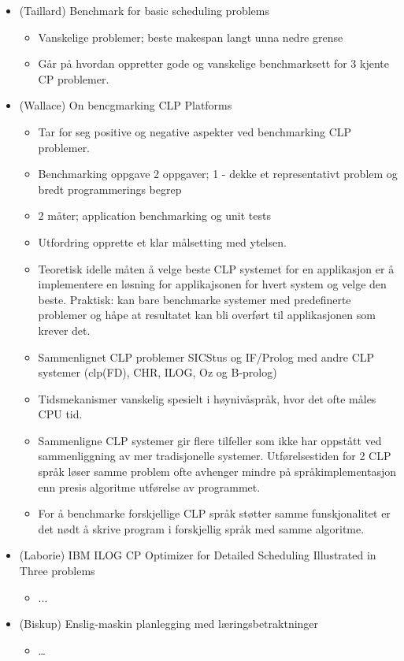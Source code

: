 \begin{itemize}
\item (Taillard) Benchmark for basic scheduling problems \cite{Taillard1993278}
\begin{itemize}
\item Vanskelige problemer; beste makespan langt unna nedre grense
\item Går på hvordan oppretter gode og vanskelige benchmarksett for 3 kjente CP problemer.
\end{itemize}
\item (Wallace) On bencgmarking CLP Platforms \cite{Wallace:2004:BCL:956860.956861}
\begin{itemize}
\item Tar for seg positive og negative aspekter ved benchmarking CLP problemer.
\item Benchmarking oppgave 2 oppgaver; 1 - dekke et representativt problem og bredt programmerings begrep
\item 2 måter; application benchmarking og unit tests
\item Utfordring opprette et klar målsetting med ytelsen.
\item Teoretisk idelle måten å velge beste CLP systemet for en applikasjon er å implementere en løsning for applikajsonen for hvert system og velge den beste. Praktisk: kan bare benchmarke systemer med predefinerte problemer og håpe at resultatet kan bli overført til applikasjonen som krever det.
\item Sammenlignet CLP problemer SICStus og IF/Prolog med andre CLP systemer (clp(FD), CHR, ILOG, Oz og B-prolog)
\item Tidsmekanismer vanskelig spesielt i høynivåspråk, hvor det ofte måles CPU tid.
\item Sammenligne CLP systemer gir flere tilfeller som ikke har oppstått ved sammenliggning av mer tradisjonelle systemer. Utførelsestiden for 2 CLP språk løser samme problem ofte avhenger mindre på språkimplementasjon enn presis algoritme utførelse av programmet.
\item For å benchmarke forskjellige CLP språk støtter samme funskjonalitet er det nødt å skrive program i forskjellig språk med samme algoritme.
\end{itemize}

\item (Laborie) IBM ILOG CP Optimizer for Detailed Scheduling Illustrated in Three problems \cite{Laborie:2009:IIC:1560579.1560593}
\begin{itemize}
\item ...
\end{itemize}

\item (Biskup) Enslig-maskin planlegging med læringsbetraktninger %
\begin{itemize}
\item \dots
\end{itemize}

\end{itemize}

